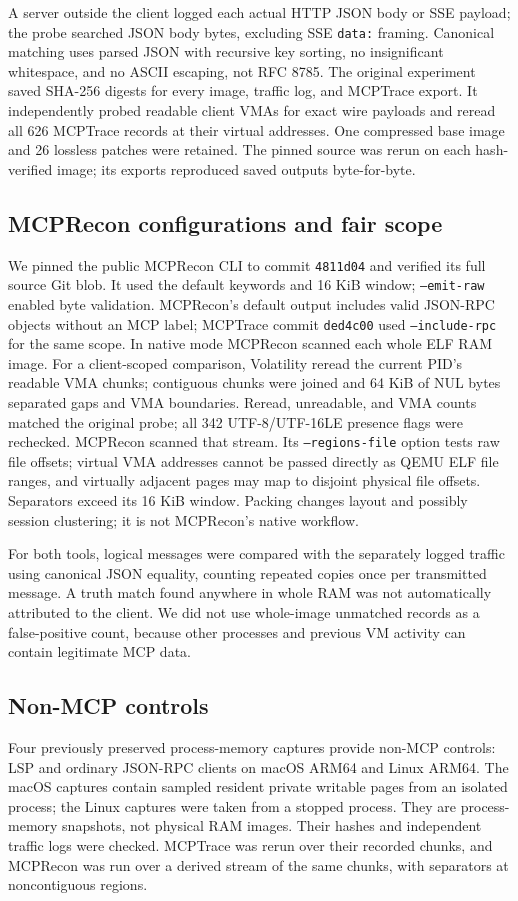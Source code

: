 \documentclass[conference,10pt]{IEEEtran}
\begin{document}
A server outside the client logged each actual HTTP JSON body or SSE payload; the probe searched JSON body bytes, excluding SSE \texttt{data:} framing. Canonical matching uses parsed JSON with recursive key sorting, no insignificant whitespace, and no ASCII escaping, not RFC 8785. The original experiment saved SHA-256 digests for every image, traffic log, and MCPTrace export. It independently probed readable client VMAs for exact wire payloads and reread all 626 MCPTrace records at their virtual addresses. One compressed base image and 26 lossless patches were retained. The pinned source was rerun on each hash-verified image; its exports reproduced saved outputs byte-for-byte.

\subsection{MCPRecon configurations and fair scope}
We pinned the public MCPRecon CLI to commit \texttt{4811d04} and verified its full source Git blob. It used the default keywords and 16 KiB window; \texttt{--emit-raw} enabled byte validation. MCPRecon's default output includes valid JSON-RPC objects without an MCP label; MCPTrace commit \texttt{ded4c00} used \texttt{--include-rpc} for the same scope. In native mode MCPRecon scanned each whole ELF RAM image. For a client-scoped comparison, Volatility reread the current PID's readable VMA chunks; contiguous chunks were joined and 64 KiB of NUL bytes separated gaps and VMA boundaries. Reread, unreadable, and VMA counts matched the original probe; all 342 UTF-8/UTF-16LE presence flags were rechecked. MCPRecon scanned that stream. Its \texttt{--regions-file} option tests raw file offsets; virtual VMA addresses cannot be passed directly as QEMU ELF file ranges, and virtually adjacent pages may map to disjoint physical file offsets. Separators exceed its 16 KiB window. Packing changes layout and possibly session clustering; it is not MCPRecon's native workflow.

For both tools, logical messages were compared with the separately logged traffic using canonical JSON equality, counting repeated copies once per transmitted message. A truth match found anywhere in whole RAM was not automatically attributed to the client. We did not use whole-image unmatched records as a false-positive count, because other processes and previous VM activity can contain legitimate MCP data.

\subsection{Non-MCP controls}
Four previously preserved process-memory captures provide non-MCP controls: LSP and ordinary JSON-RPC clients on macOS ARM64 and Linux ARM64. The macOS captures contain sampled resident private writable pages from an isolated process; the Linux captures were taken from a stopped process. They are process-memory snapshots, not physical RAM images. Their hashes and independent traffic logs were checked. MCPTrace was rerun over their recorded chunks, and MCPRecon was run over a derived stream of the same chunks, with separators at noncontiguous regions.
\end{document}

